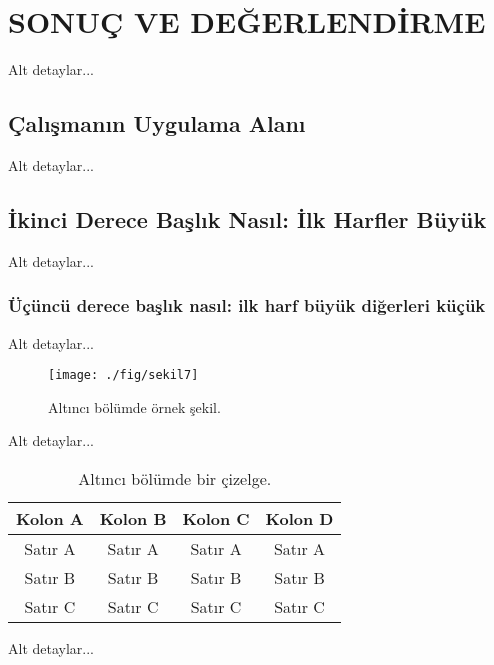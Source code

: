 \chapter{SONUÇ VE DEĞERLENDİRME}\label{ch:ch7}

Alt detaylar...

\section{\c{C}al\i \c{s}man\i n Uygulama Alan{\i}}

Alt detaylar...
\section{\.Ikinci Derece Ba\c{s}l\i k Nas\i l: \.Ilk Harfler B\"uy\"uk}

Alt detaylar...

\subsection{\"U\c{c}\"unc\"u derece ba\c{s}l\i k nas\i l: ilk harf b\"uy\"uk di\u{g}erleri k\"u\c{c}\"uk}

Alt detaylar...


\begin{figure}[h]
 \centering
 \texttt{[image: ./fig/sekil7]}
 \caption{Alt\i nc{\i} b\"ol\"umde \"ornek \c{s}ekil.}
 \label{fig:7-1}
\end{figure}

Alt detaylar...

\begin{table*}[h]
{\setlength{\tabcolsep}{14pt}
\caption{Alt\i nc{\i} b\"ol\"umde bir \c{c}izelge.}
\begin{center}
\vspace{-6mm}
\begin{tabular}{cccc}
\hline\hline
Kolon A & Kolon B & Kolon C & Kolon D \\
\hline
Sat\i r A & Sat\i r A & Sat\i r A & Sat\i r A \\
Sat\i r B & Sat\i r B & Sat\i r B & Sat\i r B \\
Sat\i r C & Sat\i r C & Sat\i r C & Sat\i r C \\
\hline
\end{tabular}
\vspace{-6mm}
\end{center}
\label{tableforCh7-1}}
\end{table*}

Alt detaylar...